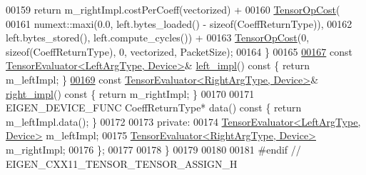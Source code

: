 \begin{DoxyCode}
00159     \textcolor{keywordflow}{return} m\_rightImpl.costPerCoeff(vectorized) +
00160            \hyperlink{class_eigen_1_1_tensor_op_cost}{TensorOpCost}(
00161                numext::maxi(0.0, left.bytes\_loaded() - \textcolor{keyword}{sizeof}(CoeffReturnType)),
00162                left.bytes\_stored(), left.compute\_cycles()) +
00163            \hyperlink{class_eigen_1_1_tensor_op_cost}{TensorOpCost}(0, \textcolor{keyword}{sizeof}(CoeffReturnType), 0, vectorized, PacketSize);
00164   \}
00165 
\hyperlink{struct_eigen_1_1_tensor_evaluator_3_01const_01_tensor_assign_op_3_01_left_arg_type_00_01_right_arg_type_01_4_00_01_device_01_4_a52e2b2245de4d6d78e747eaf88995d6d}{00167}   \textcolor{keyword}{const} \hyperlink{struct_eigen_1_1_tensor_evaluator}{TensorEvaluator<LeftArgType, Device>}& 
      \hyperlink{struct_eigen_1_1_tensor_evaluator_3_01const_01_tensor_assign_op_3_01_left_arg_type_00_01_right_arg_type_01_4_00_01_device_01_4_a52e2b2245de4d6d78e747eaf88995d6d}{left\_impl}()\textcolor{keyword}{ const }\{ \textcolor{keywordflow}{return} m\_leftImpl; \}
\hyperlink{struct_eigen_1_1_tensor_evaluator_3_01const_01_tensor_assign_op_3_01_left_arg_type_00_01_right_arg_type_01_4_00_01_device_01_4_aeb9deae6affa88fe857daf66d83e38a0}{00169}   \textcolor{keyword}{const} \hyperlink{struct_eigen_1_1_tensor_evaluator}{TensorEvaluator<RightArgType, Device>}& 
      \hyperlink{struct_eigen_1_1_tensor_evaluator_3_01const_01_tensor_assign_op_3_01_left_arg_type_00_01_right_arg_type_01_4_00_01_device_01_4_aeb9deae6affa88fe857daf66d83e38a0}{right\_impl}()\textcolor{keyword}{ const }\{ \textcolor{keywordflow}{return} m\_rightImpl; \}
00170 
00171   EIGEN\_DEVICE\_FUNC CoeffReturnType* data()\textcolor{keyword}{ const }\{ \textcolor{keywordflow}{return} m\_leftImpl.data(); \}
00172 
00173  \textcolor{keyword}{private}:
00174   \hyperlink{struct_eigen_1_1_tensor_evaluator}{TensorEvaluator<LeftArgType, Device>} m\_leftImpl;
00175   \hyperlink{struct_eigen_1_1_tensor_evaluator}{TensorEvaluator<RightArgType, Device>} m\_rightImpl;
00176 \};
00177 
00178 \}
00179 
00180 
00181 \textcolor{preprocessor}{#endif // EIGEN\_CXX11\_TENSOR\_TENSOR\_ASSIGN\_H}
\end{DoxyCode}
